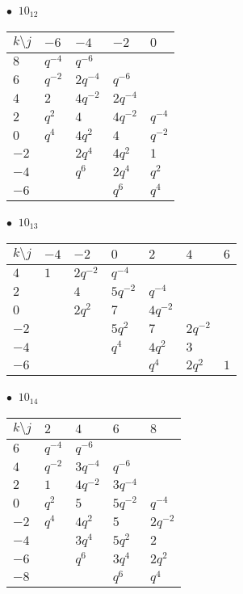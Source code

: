 %
\begin{minipage}{\linewidth}
$\bullet\ $ $10_{12}$ \vspace{0.5em} \\
\begin{tabular}{l|llll}
$k \setminus j$ & $-6$ & $-4$ & $-2$ & $0$ \\
\hline
$8$ & $q^{-4}$ & $q^{-6}$ &  &  \\
$6$ & $q^{-2}$ & $2q^{-4}$ & $q^{-6}$ &  \\
$4$ & $2$ & $4q^{-2}$ & $2q^{-4}$ &  \\
$2$ & $q^{2}$ & $4$ & $4q^{-2}$ & $q^{-4}$ \\
$0$ & $q^{4}$ & $4q^{2}$ & $4$ & $q^{-2}$ \\
$-2$ &  & $2q^{4}$ & $4q^{2}$ & $1$ \\
$-4$ &  & $q^{6}$ & $2q^{4}$ & $q^{2}$ \\
$-6$ &  &  & $q^{6}$ & $q^{4}$ \\
\end{tabular}
\vspace{2em}
\end{minipage}
%
\begin{minipage}{\linewidth}
$\bullet\ $ $10_{13}$ \vspace{0.5em} \\
\begin{tabular}{l|llllll}
$k \setminus j$ & $-4$ & $-2$ & $0$ & $2$ & $4$ & $6$ \\
\hline
$4$ & $1$ & $2q^{-2}$ & $q^{-4}$ &  &  &  \\
$2$ &  & $4$ & $5q^{-2}$ & $q^{-4}$ &  &  \\
$0$ &  & $2q^{2}$ & $7$ & $4q^{-2}$ &  &  \\
$-2$ &  &  & $5q^{2}$ & $7$ & $2q^{-2}$ &  \\
$-4$ &  &  & $q^{4}$ & $4q^{2}$ & $3$ &  \\
$-6$ &  &  &  & $q^{4}$ & $2q^{2}$ & $1$ \\
\end{tabular}
\vspace{2em}
\end{minipage}
%
\begin{minipage}{\linewidth}
$\bullet\ $ $10_{14}$ \vspace{0.5em} \\
\begin{tabular}{l|llll}
$k \setminus j$ & $2$ & $4$ & $6$ & $8$ \\
\hline
$6$ & $q^{-4}$ & $q^{-6}$ &  &  \\
$4$ & $q^{-2}$ & $3q^{-4}$ & $q^{-6}$ &  \\
$2$ & $1$ & $4q^{-2}$ & $3q^{-4}$ &  \\
$0$ & $q^{2}$ & $5$ & $5q^{-2}$ & $q^{-4}$ \\
$-2$ & $q^{4}$ & $4q^{2}$ & $5$ & $2q^{-2}$ \\
$-4$ &  & $3q^{4}$ & $5q^{2}$ & $2$ \\
$-6$ &  & $q^{6}$ & $3q^{4}$ & $2q^{2}$ \\
$-8$ &  &  & $q^{6}$ & $q^{4}$ \\
\end{tabular}
\vspace{2em}
\end{minipage}
